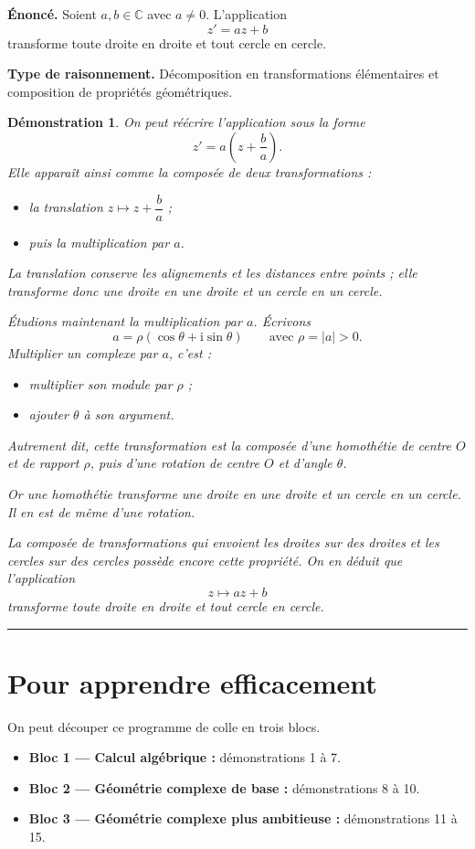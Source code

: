\documentclass[11pt,a4paper]{article}
\newtheorem{prop}{Démonstration}
\newcommand{\C}{\mathbb{C}}
\newcommand{\ii}{\mathrm{i}}
\begin{document}
\textbf{Énoncé.} Soient $a,b\in\C$ avec $a\neq 0$. L'application
\[
z'=az+b
\]
transforme toute droite en droite et tout cercle en cercle.

\textbf{Type de raisonnement.} Décomposition en transformations élémentaires et composition de propriétés géométriques.

\begin{prop}
On peut réécrire l'application sous la forme
\[
z'=a\left(z+\frac{b}{a}\right).
\]
Elle apparaît ainsi comme la composée de deux transformations :
\begin{itemize}[label=--]
    \item la translation $z\mapsto z+\dfrac{b}{a}$ ;
    \item puis la multiplication par $a$.
\end{itemize}

La translation conserve les alignements et les distances entre points ; elle transforme donc une droite en une droite et un cercle en un cercle.

Étudions maintenant la multiplication par $a$. Écrivons
\[
a=\rho(\cos\theta+\ii\sin\theta)
\qquad \text{avec } \rho=|a|>0.
\]
Multiplier un complexe par $a$, c'est :
\begin{itemize}[label=--]
    \item multiplier son module par $\rho$ ;
    \item ajouter $\theta$ à son argument.
\end{itemize}
Autrement dit, cette transformation est la composée d'une homothétie de centre $O$ et de rapport $\rho$, puis d'une rotation de centre $O$ et d'angle $\theta$.

Or une homothétie transforme une droite en une droite et un cercle en un cercle. Il en est de même d'une rotation.

La composée de transformations qui envoient les droites sur des droites et les cercles sur des cercles possède encore cette propriété. On en déduit que l'application
\[
z\mapsto az+b
\]
transforme toute droite en droite et tout cercle en cercle.
\end{prop}

\vspace{1em}
\hrule
\vspace{1em}

\section*{Pour apprendre efficacement}

On peut découper ce programme de colle en trois blocs.

\begin{itemize}
    \item \textbf{Bloc 1 --- Calcul algébrique :} démonstrations 1 à 7.
    \item \textbf{Bloc 2 --- Géométrie complexe de base :} démonstrations 8 à 10.
    \item \textbf{Bloc 3 --- Géométrie complexe plus ambitieuse :} démonstrations 11 à 15.
\end{itemize}
\end{document}
